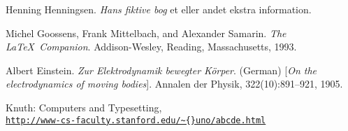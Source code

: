 \documentclass[../template/template.tex]{subfiles}
\begin{document}
    \begin{thebibliography}{x}
        Henning Henningsen.
        \textit{Hans fiktive bog}
        et eller andet ekstra information.

        Michel Goossens, Frank Mittelbach, and Alexander Samarin. 
        \textit{The \LaTeX\ Companion}. 
        Addison-Wesley, Reading, Massachusetts, 1993.

        Albert Einstein. 
        \textit{Zur Elektrodynamik bewegter K{\"o}rper}. (German) 
        [\textit{On the electrodynamics of moving bodies}]. 
        Annalen der Physik, 322(10):891–921, 1905.

        Knuth: Computers and Typesetting,
        \\\texttt{\url{http://www-cs-faculty.stanford.edu/\~{}uno/abcde.html}}
    \end{thebibliography}
\end{document}

